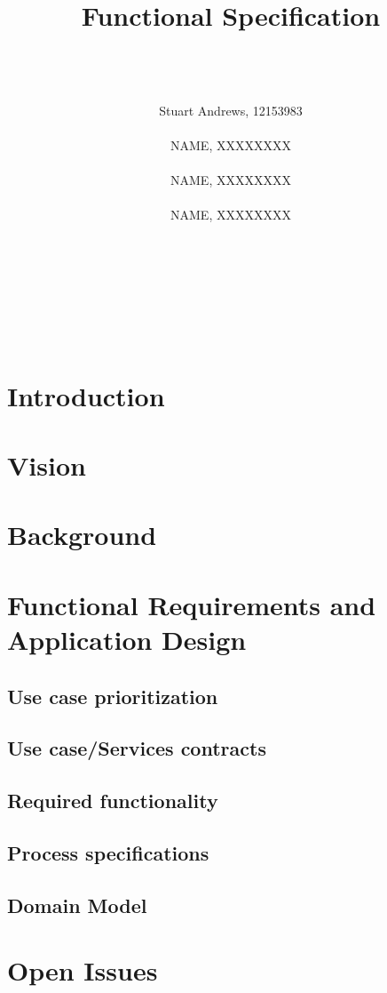 \documentclass[]{article}
\title{Functional Specification}
\author
{  
	\\\\\\
	Stuart Andrews, 12153983 
	\\\\
	NAME, XXXXXXXX
	\\\\
	NAME, XXXXXXXX 
	\\\\
	NAME, XXXXXXXX 
	\\\\\\\\\\\\\\
}
\begin{document}
\maketitle
\newpage
\tableofcontents

\newpage

\section{Introduction}
\section{Vision}
\section{Background}
\section{Functional Requirements and Application Design}
\subsection{Use case prioritization}
\subsection{Use case/Services contracts}
\subsection{Required functionality}
\subsection{Process specifications}
\subsection{Domain Model}
\section{Open Issues}
\end{document}
